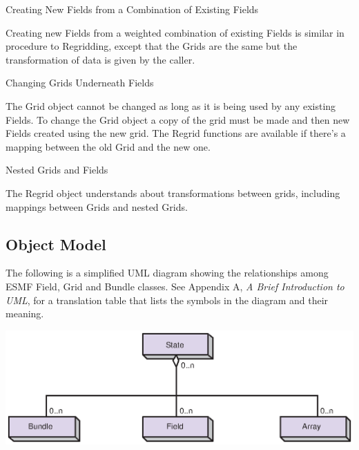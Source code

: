 \begin{description}
\item{Creating New Fields from a Combination of Existing Fields}

Creating new Fields from a weighted combination of existing
Fields is similar in procedure to Regridding, except that the
Grids are the same but the transformation of data is given 
by the caller.

\item{Changing Grids Underneath Fields}

The Grid object cannot be changed as long as it is being used
by any existing Fields.  To change the Grid object a copy of
the grid must be made and then new Fields created using the
new grid.  The Regrid functions are available if there's a 
mapping between the old Grid and the new one.

\item{Nested Grids and Fields}

The Regrid object understands about transformations between
grids, including mappings between Grids and nested Grids.

\end{description}

\subsection{Object Model}


The following is a simplified UML diagram showing the relationships among
ESMF Field, Grid and Bundle classes.  See Appendix A, {\it A Brief 
Introduction to UML},
for a translation table that lists the symbols in the diagram and their 
meaning.

\begin{center}
\includegraphics{State_obj.eps}   
\end{center}


